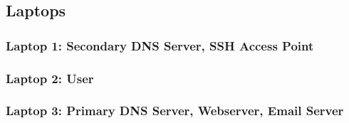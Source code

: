 \subsection{Laptops}

\subsubsection{Laptop 1: Secondary DNS Server, SSH Access Point}

\subsubsection{Laptop 2: User}

\subsubsection{Laptop 3: Primary DNS Server, Webserver, Email Server}






